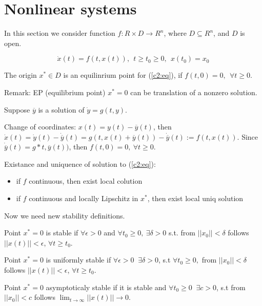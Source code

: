 \section{Nonlinear systems}

In this section we consider function $f:R\times D\rightarrow R^n$,
where $D \subseteq R^n$, and $D$ is open.

\begin{equation}\label{c2:eq}
 \dot x(t)=f(t,x(t)), \ \ t \ge t_0 \ge 0,\ \ x(t_0)=x_0
\end{equation} 

The origin $x^* \in D$ is an equilinrium point for (\ref{c2:eq}),
if $f(t,0)=0, \ \ \forall t \ge 0$.

Remark: EP (equilibrium point) $x^*=0$ can be translation of a nonzero
solution.

Suppose $\overline{y}$ is a solution of $\dot y = g(t, y)$.

Change of coordinates: $x(t)=y(t)-\overline{y}(t)$, then
$\dot x(t) = \dot y(t)-\dot{\overline{y}}(t)=
g(t, x(t)+\overline{y}(t)) - \dot{\overline{y}}(t):=f(t,x(t))$.
Since $\dot{\overline{y}}(t)=g*t,\overline{y}(t))$, then
$f(t,0)=0,\ \forall t \ge 0$.

Existance and uniquence of solution to (\ref{c2:eq}):
\begin{itemize}
 \item if $f$ continuous, then exist local colution
 \item if $f$ continuous and locally Lipschitz in $x^*$, then
 	exist local uniq solution 
\end{itemize}


Now we need new stability definitions.

 Point $x^*=0$ is stable if $\forall \epsilon > 0$ and 
 $\forall t_0 \ge 0,\ \exists \delta>0$ s.t. from $||x_0||<\delta$
 follows $||x(t)|| < \epsilon$, $\forall t  \ge t_0$.

 Point $x^*=0$ is uniformly stable if $\forall \epsilon > 0\ $  
 $\exists \delta>0$, s.t $\forall t_0 \ge 0,$ from $||x_0||<\delta$
 follows $||x(t)|| < \epsilon$, $\forall t  \ge t_0$.

 Point $x^*=0$ asymptoticaly stable if it is stable and $\forall t_0 \ge 0\ $  
 $\exists c>0$, s.t from $||x_0||<c$
 follows $\lim_{t\to \infty} ||x(t)|| \to 0$.


